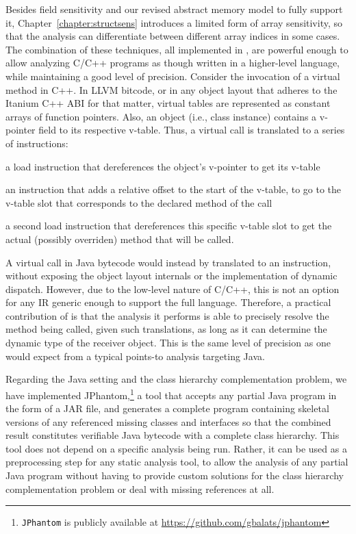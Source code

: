 Besides field sensitivity and our revised abstract memory model to
fully support it, Chapter~\ref{chapter:structsens} introduces a
limited form of array sensitivity, so that the analysis can
differentiate between different array indices in some cases. The
combination of these techniques, all implemented in \cclyzer{}, are
powerful enough to allow analyzing C/C++ programs as though written in
a higher-level language, while maintaining a good level of
precision. Consider the invocation of a virtual method in C++. In LLVM
bitcode, or in any object layout that adheres to the Itanium C++ ABI
\cite{itanium:cxx_abi} for that matter, virtual tables are represented
as constant arrays of function pointers. Also, an object (i.e., class
instance) contains a v-pointer field to its respective v-table. Thus,
a virtual call is translated to a series of instructions:
\begin{compactitem}[\(\cdot\)]
\item a load instruction that dereferences the object's v-pointer to
  get its v-table
\item an instruction that adds a relative offset to the start of the
  v-table, to go to the v-table slot that corresponds to the declared
  method of the call
\item a second load instruction that dereferences this specific
  v-table slot to get the actual (possibly overriden) method that will
  be called.
\end{compactitem}

A virtual call in Java bytecode would instead by translated to an
 instruction, without exposing the object layout
internals or the implementation of dynamic dispatch. However, due to
the low-level nature of C/C++, this is not an option for any IR
generic enough to support the full language. Therefore, a practical
contribution of \cclyzer{} is that the analysis it performs is able to
precisely resolve the method being called, given such translations, as
long as it can determine the dynamic type of the receiver object. This
is the same level of precision as one would expect from a typical
points-to analysis targeting Java.

Regarding the Java setting and the class hierarchy complementation
problem, we have implemented JPhantom,\footnote{\texttt{JPhantom} is
  publicly available at \url{https://github.com/gbalats/jphantom}} a
tool that accepts any partial Java program in the form of a JAR file,
and generates a complete program containing skeletal versions of any
referenced missing classes and interfaces so that the combined result
constitutes verifiable Java bytecode with a complete class
hierarchy. This tool does not depend on a specific analysis being
run. Rather, it can be used as a preprocessing step for any static
analysis tool, to allow the analysis of any partial Java program
without having to provide custom solutions for the class hierarchy
complementation problem or deal with missing references at all.

